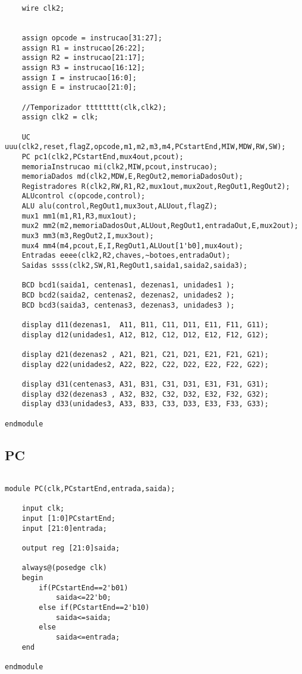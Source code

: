 \begin{lstlisting}
	wire clk2;
	
	
	assign opcode = instrucao[31:27];
	assign R1 = instrucao[26:22];
	assign R2 = instrucao[21:17];
	assign R3 = instrucao[16:12];
	assign I = instrucao[16:0];
	assign E = instrucao[21:0];
	
	//Temporizador tttttttt(clk,clk2);
	assign clk2 = clk;
	
	UC uuu(clk2,reset,flagZ,opcode,m1,m2,m3,m4,PCstartEnd,MIW,MDW,RW,SW);
	PC pc1(clk2,PCstartEnd,mux4out,pcout);
	memoriaInstrucao mi(clk2,MIW,pcout,instrucao);
	memoriaDados md(clk2,MDW,E,RegOut2,memoriaDadosOut);
	Registradores R(clk2,RW,R1,R2,mux1out,mux2out,RegOut1,RegOut2);
	ALUcontrol c(opcode,control);
	ALU alu(control,RegOut1,mux3out,ALUout,flagZ);
	mux1 mm1(m1,R1,R3,mux1out);
	mux2 mm2(m2,memoriaDadosOut,ALUout,RegOut1,entradaOut,E,mux2out);
	mux3 mm3(m3,RegOut2,I,mux3out);
	mux4 mm4(m4,pcout,E,I,RegOut1,ALUout[1'b0],mux4out);
	Entradas eeee(clk2,R2,chaves,~botoes,entradaOut);
	Saidas ssss(clk2,SW,R1,RegOut1,saida1,saida2,saida3);
	
	BCD bcd1(saida1, centenas1, dezenas1, unidades1 );
	BCD bcd2(saida2, centenas2, dezenas2, unidades2 );
	BCD bcd3(saida3, centenas3, dezenas3, unidades3 );
	
	display d11(dezenas1,  A11, B11, C11, D11, E11, F11, G11);
	display d12(unidades1, A12, B12, C12, D12, E12, F12, G12);
	
	display d21(dezenas2 , A21, B21, C21, D21, E21, F21, G21);
	display d22(unidades2, A22, B22, C22, D22, E22, F22, G22);
	
	display d31(centenas3, A31, B31, C31, D31, E31, F31, G31);
	display d32(dezenas3 , A32, B32, C32, D32, E32, F32, G32);
	display d33(unidades3, A33, B33, C33, D33, E33, F33, G33);
	
endmodule

\end{lstlisting}
\clearpage

\subsection{PC}
\begin{lstlisting}

module PC(clk,PCstartEnd,entrada,saida);

	input clk;
	input [1:0]PCstartEnd;
	input [21:0]entrada;
	
	output reg [21:0]saida;
	
	always@(posedge clk)
	begin
		if(PCstartEnd==2'b01)
			saida<=22'b0;
		else if(PCstartEnd==2'b10)
			saida<=saida;
		else
			saida<=entrada;
	end
	
endmodule

\end{lstlisting}
\clearpage

